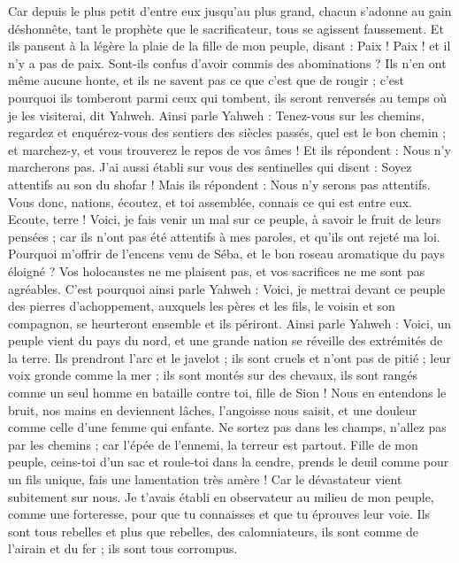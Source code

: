 \begin{multicols}{2}
Car depuis le plus petit d'entre eux jusqu'au plus grand, chacun s'adonne au gain déshonnête, tant le prophète que le sacrificateur, tous se agissent faussement.
Et ils pansent à la légère la plaie de la fille de mon peuple, disant : Paix ! Paix ! et il n'y a pas de paix.
Sont-ils confus d'avoir commis des abominations ? Ils n'en ont même aucune honte, et ils ne savent pas ce que c'est que de rougir ; c'est pourquoi ils tomberont parmi ceux qui tombent, ils seront renversés au temps où je les visiterai, dit Yahweh.
Ainsi parle Yahweh : Tenez-vous sur les chemins, regardez et enquérez-vous des sentiers des siècles passés, quel est le bon chemin ; et marchez-y, et vous trouverez le repos de vos âmes ! Et ils répondent : Nous n'y marcherons pas.
J'ai aussi établi sur vous des sentinelles qui disent : Soyez attentifs au son du shofar ! Mais ils répondent : Nous n'y serons pas attentifs.
Vous donc, nations, écoutez, et toi assemblée, connais ce qui est entre eux.
Ecoute, terre ! Voici, je fais venir un mal sur ce peuple, à savoir le fruit de leurs pensées ; car ils n'ont pas été attentifs à mes paroles, et qu'ils ont rejeté ma loi.
Pourquoi m'offrir de l'encens venu de Séba, et le bon roseau aromatique du pays éloigné ? Vos holocaustes ne me plaisent pas, et vos sacrifices ne me sont pas agréables.
C'est pourquoi ainsi parle Yahweh : Voici, je mettrai devant ce peuple des pierres d'achoppement, auxquels les pères et les fils, le voisin et son compagnon, se heurteront ensemble et ils périront.
Ainsi parle Yahweh : Voici, un peuple vient du pays du nord, et une grande nation se réveille des extrémités de la terre.
Ils prendront l'arc et le javelot ; ils sont cruels et n'ont pas de pitié ; leur voix gronde comme la mer ; ils sont montés sur des chevaux, ils sont rangés comme un seul homme en bataille contre toi, fille de Sion !
Nous en entendons le bruit, nos mains en deviennent lâches, l'angoisse nous saisit, et une douleur comme celle d'une femme qui enfante.
Ne sortez pas dans les champs, n'allez pas par les chemins ; car l'épée de l'ennemi, la terreur est partout.
Fille de mon peuple, ceins-toi d'un sac et roule-toi dans la cendre, prends le deuil comme pour un fils unique, fais une lamentation très amère ! Car le dévastateur vient subitement sur nous.
Je t'avais établi en observateur au milieu de mon peuple, comme une forteresse, pour que tu connaisses et que tu éprouves leur voie.
Ils sont tous rebelles et plus que rebelles, des calomniateurs, ils sont comme de l'airain et du fer ; ils sont tous corrompus.

\end{multicols}
